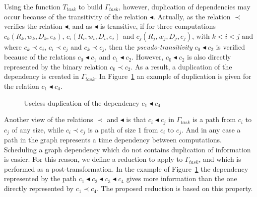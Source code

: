 Using the function $T_{task}$ to build $\Gamma_{task}$, however, duplication of dependencies may occur because of the transitivity of the relation $\blacktriangleleft$. Actually, as the relation $\prec$ verifies the relation $\blacktriangleleft$, and as $\blacktriangleleft$ is transitive, if for three computations $c_k(R_k,w_k,D_k,e_k)$, $c_i(R_i,w_i,D_i,e_i)$ and $c_j(R_j,w_j,D_j,e_j)$, with $k<i<j$ and where $c_k \prec c_i$, $c_i \prec c_j$ and $c_k \prec c_j$, then the \textit{pseudo-transitivity} $c_0 \blacktriangleleft c_2$ is verified because of the relations $c_0 \blacktriangleleft c_1$ and $c_1 \blacktriangleleft c_2$. However, $c_0 \blacktriangleleft c_2$ is also directly represented by the binary relation $c_0 \prec c_2$. As a result, a duplication of the dependency is created in $\Gamma_{task}$. In Figure~\ref{fig:duplication} an example of duplication is given for the relation $c_1 \blacktriangleleft c_4$.

\begin{figure}[h!]
\begin{center}
  \caption{Useless duplication of the dependency $c_1 \blacktriangleleft c_4$}
  \label{fig:duplication}
\end{center}
\end{figure}

Another view of the relations $\prec$ and $\blacktriangleleft$ is that $c_i\blacktriangleleft c_j$ in $\Gamma_{task}$ is a path from $c_i$ to $c_j$ of any size, while $c_i \prec c_j$ is a path of size $1$ from $c_i$ to $c_j$. And in any case a path in the graph represents a time dependency between computations. Scheduling a graph dependency which do not contains duplication of information is easier. For this reason, we define a reduction to apply to $\Gamma_{task}$, and which is performed as a post-transformation. In the example of Figure~\ref{fig:duplication} the dependency represented by the path $c_1 \blacktriangleleft c_2 \blacktriangleleft c_3 \blacktriangleleft c_4$ gives more information than the one directly represented by $c_1 \prec c_4$. The proposed reduction is based on this property.

